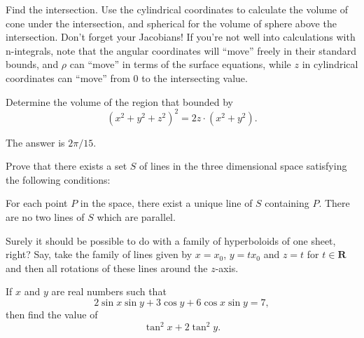 \begin{solution}[name={Harun Šiljak's Hint}]
	Find the intersection. Use the cylindrical coordinates to calculate the volume of cone under the intersection, and spherical for the volume of sphere above the intersection. Don't forget your Jacobians!
	If you're not well into calculations with n-integrals, note that the angular coordinates will ``move'' freely in their standard bounds, and $ \rho$ can ``move'' in terms of the surface equations, while $ z$ in cylindrical coordinates can ``move'' from 0 to the intersecting value.
\end{solution}



\begin{question}[name={Wisheskernel's Spherical Coordinates}]
	Determine the volume of the region that bounded by $$ \left( x^{2}+y^{2}+z^{2} \right)^{2}=2z \cdot \left( x^{2}+y^{2}  \right).$$
\end{question}

\begin{solution}
	The answer is $2\pi/15$.
\end{solution}



\begin{question}[name={2010 Olympic Revenge}]
	Prove that there exists a set $S$ of lines in the three dimensional space satisfying the following conditions:
	\begin{tasks}
		\task For each point $P$ in the space, there exist a unique line of $S$ containing $P$.
		\task There are no two lines of $S$ which are parallel.
	\end{tasks}
\end{question}

\begin{solution}[name={Solution by JBL}]
	Surely it should be possible to do with a family of hyperboloids of one sheet, right? Say, take the family of lines given by $x = x_0$, $y = tx_0$ and $z = t$ for $t \in \mathbf{R}$ and then all rotations of these lines around the $z$-axis.
\end{solution}


\begin{question} 
	If $x$ and $y$ are real numbers such that $$2\sin x \sin y + 3 \cos y + 6\cos x \sin y=7,$$ then find the value of $$ \tan^2 x+2\tan^2 y.$$
\end{question}


